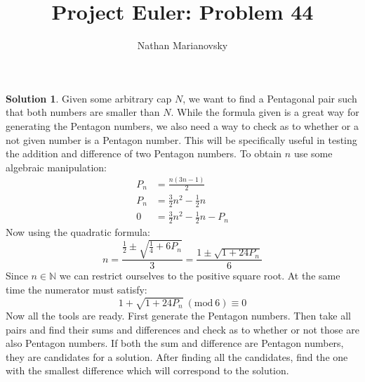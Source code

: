 \documentclass[12pt, letterpaper, onecolumn, conference, final]{IEEEtran}
\title{Project Euler: Problem 44}
\author{Nathan Marianovsky}
\newcommand{\Mod}[1]{\ (\text{mod}\ #1)}
\theoremstyle{definition}
\newtheorem*{problem*}{Problem}
\newtheorem*{solution*}{Solution}
\theoremstyle{plain}
\begin{document}
\maketitle

\begin{center}
\end{center}

\vspace{.3cm}
\begin{solution*}
Given some arbitrary cap $N$, we want to find a Pentagonal pair such that both numbers are smaller than $N$. While the formula given is a great way for generating the Pentagon numbers, we also need a way to check as to whether or a not given number is a Pentagon number. This will be specifically useful in testing the addition and difference of two Pentagon numbers. To obtain $n$ use some algebraic manipulation:
\begin{equation*}
\begin{split}
P_n &= \frac{n(3n-1)}{2} \\
P_n &= \frac{3}{2}n^2 - \frac{1}{2}n \\
0 &= \frac{3}{2}n^2 - \frac{1}{2}n - P_n
\end{split}
\end{equation*}
Now using the quadratic formula:
\begin{equation*}
n = \frac{\frac{1}{2} \pm \sqrt{\frac{1}{4} + 6P_n}}{3} = \frac{1 \pm \sqrt{1 + 24P_n}}{6}
\end{equation*}
Since $n \in \mathbb{N}$ we can restrict ourselves to the positive square root. At the same time the numerator must satisfy:
\begin{equation*}
1 + \sqrt{1 + 24P_n} \Mod 6 \equiv 0
\end{equation*}
Now all the tools are ready. First generate the Pentagon numbers. Then take all pairs and find their sums and differences and check as to whether or not those are also Pentagon numbers. If both the sum and difference are Pentagon numbers, they are candidates for a solution. After finding all the candidates, find the one with the smallest difference which will correspond to the solution.
\end{solution*}
\end{document}
